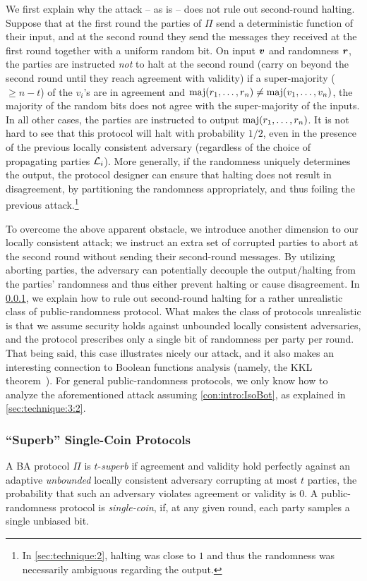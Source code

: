 We first explain why the attack -- as is -- does not rule out second-round halting. Suppose that at the first round the parties of $\Pi$ send a deterministic function of their input, and at the second round they send the messages they received at the first round together with a uniform random bit. On input ${ \boldsymbol{v}}$ and randomness ${ \boldsymbol{r}}$, the parties are instructed \emph{not} to halt at the second round (\ie carry on beyond the second round until they reach agreement with validity) if a super-majority ($\ge n-t$) of the $v_i$'s are in agreement and $\operatorname*{maj}(r_1,\ldots, r_n)\neq \operatorname*{maj}(v_1,\ldots, v_n)$, \ie the majority of the random bits does not agree with the super-majority of the inputs. In all other cases, the parties are instructed to output $\operatorname*{maj}(r_1,\ldots, r_n)$.
It is not hard to see that this protocol will halt with probability $1/2$, even in the presence of the previous locally consistent adversary (regardless of the choice of propagating parties ${\cal{L}}_i$). More generally, if the randomness uniquely determines the output, the protocol designer can ensure that halting does not result in disagreement, by partitioning the randomness appropriately, and thus foiling the previous attack.\footnote{In \cref{sec:technique:2}, halting was close to $1$ and thus the randomness was necessarily ambiguous regarding the output.}

To overcome the above apparent obstacle, we introduce another dimension to our locally consistent attack; we instruct an extra set of corrupted parties to abort at the second round without sending their second-round messages. By utilizing aborting parties, the adversary can potentially decouple the output/halting from the parties' randomness and thus either prevent halting or cause disagreement.
In \cref{sec:technique:3:1}, we explain how to rule out second-round halting for a rather unrealistic class of public-randomness protocol. What makes the class of protocols unrealistic is that we assume security holds against unbounded locally consistent adversaries, and the protocol prescribes only a single bit of randomness per party per round. That being said, this case illustrates nicely our attack, and it also makes an interesting connection to Boolean functions analysis (namely, the KKL theorem~\cite{KKL88}). For general public-randomness protocols, we only know how to analyze the aforementioned attack assuming \cref{con:intro:IsoBot}, as explained in \cref{sec:technique:3:2}.

\subsubsection{``Superb'' Single-Coin Protocols}\label{sec:technique:3:1}
A BA protocol $\Pi$ is $t$-\emph{superb} if agreement and validity hold perfectly against an adaptive \emph{unbounded} locally consistent adversary corrupting at most $t$ parties, \ie the probability that such an adversary violates agreement or validity
is $0$. A public-randomness protocol is \emph{single-coin}, if, at any given round, each party samples a single unbiased bit.

